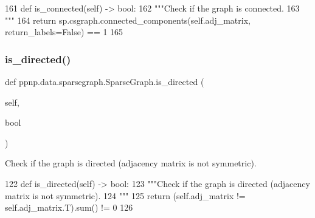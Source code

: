 \begin{DoxyCode}
161     \textcolor{keyword}{def }is\_connected(self) -> bool:
162         \textcolor{stringliteral}{"""Check if the graph is connected.}
163 \textcolor{stringliteral}{        """}
164         \textcolor{keywordflow}{return} sp.csgraph.connected\_components(self.adj\_matrix, return\_labels=\textcolor{keyword}{False}) == 1
165 
\end{DoxyCode}
\mbox{\label{classppnp_1_1data_1_1sparsegraph_1_1SparseGraph_a3d8a060f384b201d500c3ac5721924cf}} 
\subsubsection{\texorpdfstring{is\+\_\+directed()}{is\_directed()}}
{\footnotesize\ttfamily def ppnp.\+data.\+sparsegraph.\+Sparse\+Graph.\+is\+\_\+directed (\begin{DoxyParamCaption}\item[{}]{self,  }\item[{}]{bool }\end{DoxyParamCaption})}

\begin{DoxyVerb}Check if the graph is directed (adjacency matrix is not symmetric).
\end{DoxyVerb}
 
\begin{DoxyCode}
122     \textcolor{keyword}{def }is\_directed(self) -> bool:
123         \textcolor{stringliteral}{"""Check if the graph is directed (adjacency matrix is not symmetric).}
124 \textcolor{stringliteral}{        """}
125         \textcolor{keywordflow}{return} (self.adj\_matrix != self.adj\_matrix.T).sum() != 0
126 
\end{DoxyCode}
\mbox{\label{classppnp_1_1data_1_1sparsegraph_1_1SparseGraph_a85c07556b5f4f1a43c92d52b4f74a81d}} 
